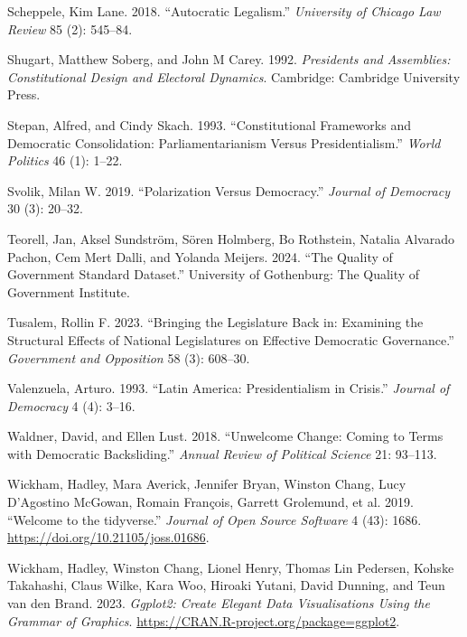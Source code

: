 \documentclass[
  letterpaper,
  DIV=11,
  numbers=noendperiod]{scrartcl}
\newlength{\cslhangindent}
\newenvironment{CSLReferences}[2] %
 {\begin{list}{}{%
  \setlength{\itemindent}{0pt}
  \setlength{\leftmargin}{0pt}
  \setlength{\parsep}{0pt}
  \ifodd #1
   \setlength{\leftmargin}{\cslhangindent}
   \setlength{\itemindent}{-1\cslhangindent}
  \fi
  \setlength{\itemsep}{#2\baselineskip}}}
 {\end{list}}
\begin{document}
\begin{CSLReferences}{1}{0}
Scheppele, Kim Lane. 2018. {``Autocratic Legalism.''} \emph{University
of Chicago Law Review} 85 (2): 545--84.

Shugart, Matthew Soberg, and John M Carey. 1992. \emph{Presidents and
Assemblies: Constitutional Design and Electoral Dynamics}. Cambridge:
Cambridge University Press.

Stepan, Alfred, and Cindy Skach. 1993. {``Constitutional Frameworks and
Democratic Consolidation: Parliamentarianism Versus Presidentialism.''}
\emph{World Politics} 46 (1): 1--22.

Svolik, Milan W. 2019. {``Polarization Versus Democracy.''}
\emph{Journal of Democracy} 30 (3): 20--32.

Teorell, Jan, Aksel Sundström, Sören Holmberg, Bo Rothstein, Natalia
Alvarado Pachon, Cem Mert Dalli, and Yolanda Meijers. 2024. {``The
Quality of Government Standard Dataset.''} University of Gothenburg: The
Quality of Government Institute.

Tusalem, Rollin F. 2023. {``Bringing the Legislature Back in: Examining
the Structural Effects of National Legislatures on Effective Democratic
Governance.''} \emph{Government and Opposition} 58 (3): 608--30.

Valenzuela, Arturo. 1993. {``Latin America: Presidentialism in
Crisis.''} \emph{Journal of Democracy} 4 (4): 3--16.

Waldner, David, and Ellen Lust. 2018. {``Unwelcome Change: Coming to
Terms with Democratic Backsliding.''} \emph{Annual Review of Political
Science} 21: 93--113.

Wickham, Hadley, Mara Averick, Jennifer Bryan, Winston Chang, Lucy
D'Agostino McGowan, Romain François, Garrett Grolemund, et al. 2019.
{``Welcome to the {tidyverse}.''} \emph{Journal of Open Source Software}
4 (43): 1686. \url{https://doi.org/10.21105/joss.01686}.

Wickham, Hadley, Winston Chang, Lionel Henry, Thomas Lin Pedersen,
Kohske Takahashi, Claus Wilke, Kara Woo, Hiroaki Yutani, David Dunning,
and Teun van den Brand. 2023. \emph{Ggplot2: Create Elegant Data
Visualisations Using the Grammar of Graphics}.
\url{https://CRAN.R-project.org/package=ggplot2}.


\end{CSLReferences}
\end{document}
